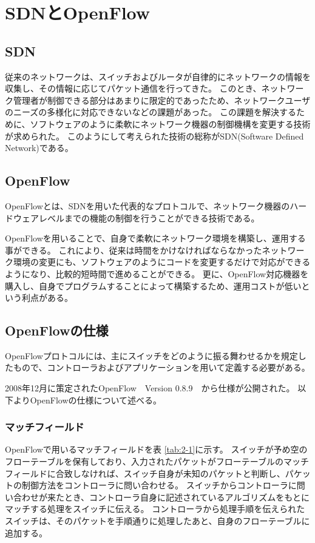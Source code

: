 \section{SDNとOpenFlow}

\subsection{SDN}

従来のネットワークは、スイッチおよびルータが自律的にネットワークの情報を収集し、その情報に応じてパケット通信を行ってきた\cite{openflownet}。
このとき、ネットワーク管理者が制御できる部分はあまりに限定的であったため、ネットワークユーザのニーズの多様化に対応できないなどの課題があった。
この課題を解決するために、ソフトウェアのように柔軟にネットワーク機器の制御機構を変更する技術が求められた。
このようにして考えられた技術の総称がSDN(Software Defined Network)である。

\subsection{OpenFlow}

OpenFlowとは、SDNを用いた代表的なプロトコルで、ネットワーク機器のハードウェアレベルまでの機能の制御を行うことができる技術である\cite{openflowjapanese}。

OpenFlowを用いることで、自身で柔軟にネットワーク環境を構築し、運用する事ができる。
これにより、従来は時間をかけなければならなかったネットワーク環境の変更にも、ソフトウェアのようにコードを変更するだけで対応ができるようになり、比較的短時間で進めることができる。
更に、OpenFlow対応機器を購入し、自身でプログラムすることによって構築するため、運用コストが低いという利点がある。

\subsection{OpenFlowの仕様}

OpenFlowプロトコルには、主にスイッチをどのように振る舞わせるかを規定したもので、コントローラおよびアプリケーションを用いて定義する必要がある。


2008年12月に策定されたOpenFlow　Version 0.8.9\cite{openflow}　から仕様が公開された。
以下よりOpenFlowの仕様について述べる。

\subsubsection{マッチフィールド}

OpenFlowで用いるマッチフィールドを表 \ref{tab:2-1}に示す\cite{openflow}。
スイッチが予め空のフローテーブルを保有しており、入力されたパケットがフローテーブルのマッチフィールドに合致しなければ、スイッチ自身が未知のパケットと判断し、パケットの制御方法をコントローラに問い合わせる。
スイッチからコントローラに問い合わせが来たとき、コントローラ自身に記述されているアルゴリズムをもとにマッチする処理をスイッチに伝える。
コントローラから処理手順を伝えられたスイッチは、そのパケットを手順通りに処理したあと、自身のフローテーブルに追加する。

